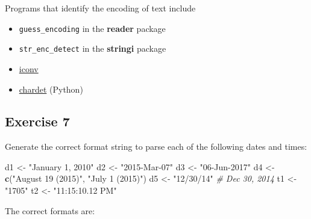 \documentclass[]{book}
\newenvironment{Shaded}{\begin{snugshade}}{\end{snugshade}}
\newcommand{\CommentTok}[1]{\textcolor[rgb]{0.56,0.35,0.01}{\textit{#1}}}
\newcommand{\KeywordTok}[1]{\textcolor[rgb]{0.13,0.29,0.53}{\textbf{#1}}}
\newcommand{\NormalTok}[1]{#1}
\newcommand{\StringTok}[1]{\textcolor[rgb]{0.31,0.60,0.02}{#1}}
\providecommand{\tightlist}{%
  \setlength{\itemsep}{0pt}\setlength{\parskip}{0pt}}
\theoremstyle{plain}
\theoremstyle{remark}
\theoremstyle{definition}
\theoremstyle{definition}
\theoremstyle{definition}
\theoremstyle{remark}
\begin{document}
Programs that identify the encoding of text include

\begin{itemize}
\tightlist
\item
  \texttt{guess\_encoding} in the \textbf{reader} package
\item
  \texttt{str\_enc\_detect} in the \textbf{stringi} package
\item
  \href{https://en.wikipedia.org/wiki/Iconv}{iconv}
\item
  \href{https://github.com/chardet/chardet}{chardet} (Python)
\end{itemize}

\hypertarget{exercise-7-2}{%
\subsection{Exercise 7}\label{exercise-7-2}}

Generate the correct format string to parse each of the following dates
and times:

\begin{Shaded}
\begin{Highlighting}[]
\NormalTok{d1 <-}\StringTok{ "January 1, 2010"}
\NormalTok{d2 <-}\StringTok{ "2015-Mar-07"}
\NormalTok{d3 <-}\StringTok{ "06-Jun-2017"}
\NormalTok{d4 <-}\StringTok{ }\KeywordTok{c}\NormalTok{(}\StringTok{"August 19 (2015)"}\NormalTok{, }\StringTok{"July 1 (2015)"}\NormalTok{)}
\NormalTok{d5 <-}\StringTok{ "12/30/14"} \CommentTok{# Dec 30, 2014}
\NormalTok{t1 <-}\StringTok{ "1705"}
\NormalTok{t2 <-}\StringTok{ "11:15:10.12 PM"}
\end{Highlighting}
\end{Shaded}

The correct formats are:

\begin{Shaded}
\end{Shaded}
\end{document}

